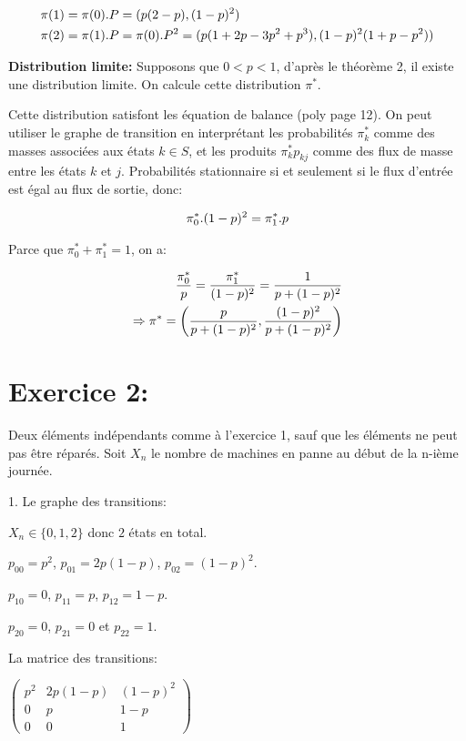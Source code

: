 \documentclass[a4paper,twoside,12pt]{article}
\begin{document}
\begin{align}
    \pi(1) &= \pi(0).P = (p(2-p), (1-p)^2)\notag \\
    \pi(2) &= \pi(1).P = \pi(0).P^2 = (p(1+2p-3p^2+p^3), (1-p)^2(1+p-p^2)) \notag
\end{align}

\textbf{Distribution limite:} Supposons que $0 < p < 1$, d'après le théorème 2, il existe une distribution limite. On calcule cette distribution $\pi^{*}$.

Cette distribution satisfont les équation de balance (poly page 12). On peut utiliser le graphe de transition en interprétant les probabilités $\pi^{*}_k$ comme des masses associées aux états $k \in S$, et les produits $\pi^{*}_kp_{kj}$ comme des flux de masse entre les états $k$ et $j$. Probabilités stationnaire si et seulement si le flux d'entrée est égal au flux de sortie, donc:

\begin{align}
    \pi^{*}_0.(1-p)^2 = \pi^{*}_1.p \notag
\end{align}

Parce que $\pi^{*}_0 + \pi^{*}_1 = 1$, on a:

\begin{align}
    \dfrac{\pi^{*}_0}{p} = \dfrac{\pi^{*}_1}{(1-p)^2} = \dfrac{1}{p+(1-p)^2} \notag \\
    \Rightarrow \pi^{*} = \left(\dfrac{p}{p+(1-p)^2}, \dfrac{(1-p)^2}{p+(1-p)^2}\right)\notag
\end{align}

\section{Exercice 2:}
Deux éléments indépendants comme à l'exercice 1, sauf que les éléments ne peut pas être réparés. Soit $X_n$ le nombre de machines en panne au début de la n-ième journée.

1. Le graphe des transitions:

$X_n \in \{0, 1, 2\}$ donc $2$ états en total.

$p_{00} = p^2$, $p_{01} = 2p(1-p)$, $p_{02} = (1-p)^2$.

$p_{10} = 0$, $p_{11} = p$, $p_{12} = 1-p$.

$p_{20} = 0$, $p_{21} = 0$ et $p_{22} = 1$.

La matrice des transitions:

$\left(\begin{array}{ccc}
    p^2 & 2p(1-p) & (1-p)^2 \\
    0 & p & 1-p \\
    0 & 0 & 1
\end{array}
\right)$
\end{document}

